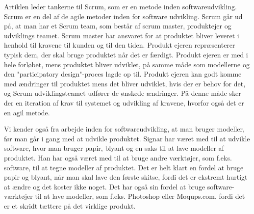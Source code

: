 \documentclass[a4paper,12pt]{article}
\begin{document}
Artiklen leder tankerne til Scrum, som er en metode inden softwareudvikling. Scrum er en del af de agile metoder inden for software udvikling. Scrum går ud på, at man har et Scrum team, som består af scrum master, produktejer og udviklings teamet. Scrum master har ansvaret for at produktet bliver leveret i henhold til kravene til kunden og til den tiden. Produkt ejeren repræsenterer typisk dem, der skal bruge produktet når det er færdigt. Produkt ejeren er med i hele forløbet, mens produktet bliver udviklet, på samme måde som modellerne og den "participatory design"-proces lagde op til. Produkt ejeren kan godt komme med ændringer til produktet mens det bliver udviklet, hvis der er behov for det, og Scrum udviklingsteamet udfører de ønskede ændringer. På denne måde sker der en iteration af krav til systemet og udvikling af kravene, hvorfor også det er en agil metode.

Vi kender også fra arbejde inden for softwareudvikling, at man bruger modeller, før man går i gang med at udvikle produktet. Signar har været med til at udvikle software, hvor man bruger papir, blyant og en saks til at lave modeller af produktet. Han har også været med til at bruge andre værktøjer, som f.eks. software, til at tegne modeller af produktet. Det er helt klart en fordel at bruge papir og blyant, når man skal lave den første skitse, fordi det er ekstremt hurtigt at ændre og det koster ikke noget. Det har også sin fordel at bruge software-værktøjer til at lave modeller, som f.eks. Photoshop eller Moqups.com, fordi det er et skridt tættere på det virklige produkt.
\end{document}
